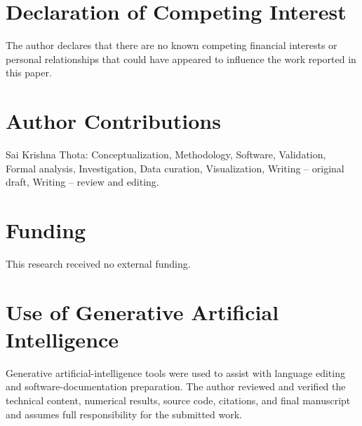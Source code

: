 \section*{Declaration of Competing Interest}

The author declares that there are no known competing financial interests
or personal relationships that could have appeared to influence the work
reported in this paper.

\section*{Author Contributions}

Sai Krishna Thota: Conceptualization, Methodology, Software, Validation,
Formal analysis, Investigation, Data curation, Visualization, Writing --
original draft, Writing -- review and editing.

\section*{Funding}

This research received no external funding.

\section*{Use of Generative Artificial Intelligence}

Generative artificial-intelligence tools were used to assist with language
editing and software-documentation preparation. The author reviewed and
verified the technical content, numerical results, source code, citations,
and final manuscript and assumes full responsibility for the submitted work.
